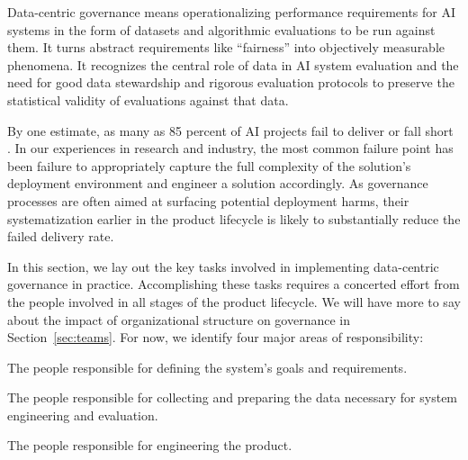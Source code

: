 Data-centric governance means operationalizing performance requirements for AI systems in the form of datasets and algorithmic evaluations to be run against them. It turns abstract requirements like ``fairness'' into objectively measurable phenomena. It recognizes the central role of data in AI system evaluation and the need for good data stewardship and rigorous evaluation protocols to preserve the statistical validity of evaluations against that data.


By one estimate, as many as 85 percent of AI projects fail to deliver or fall short \cite{gartner_predicts_2018}. In our experiences in research and industry, the most common failure point has been failure to appropriately capture the full complexity of the solution's deployment environment and engineer a solution accordingly. As governance processes are often aimed at surfacing potential deployment harms, their systematization earlier in the product lifecycle is likely to substantially reduce the failed delivery rate.

In this section, we lay out the key tasks involved in implementing data-centric governance in practice. Accomplishing these tasks requires a concerted effort from the people involved in all stages of the product lifecycle. We will have more to say about the impact of organizational structure on governance in Section~\ref{sec:teams}. For now, we identify four major areas of responsibility:

\begin{definition}
The people responsible for defining the system's goals and requirements.
\end{definition}

\begin{definition}
The people responsible for collecting and preparing the data necessary for system engineering and evaluation.
\end{definition}

\begin{definition}
The people responsible for engineering the product.
\end{definition}

